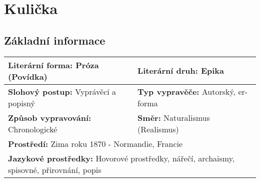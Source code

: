 \section{Kulička}
\subsection*{Základní informace}
\begin{tabularx}{\linewidth}{l|l}
    \textbf{Literární forma:} Próza (Povídka)    & \textbf{Literární druh:} Epika                                         \\
    \hline
    \textbf{Slohový postup:} Vyprávěcí a popisný & \textbf{Typ vypravěče:} Autorský, er-forma                             \\
    \hline
    \textbf{Způsob vypravování:} Chronologické   & \textbf{Směr:} Naturalismus (Realismus)                                \\
    \hline
    \multicolumn{2}{l}{\textbf{Prostředí:} Zima roku 1870 - Normandie, Francie}                                           \\
    \hline
    \multicolumn{2}{l}{\textbf{Jazykové prostředky:} Hovorové prostředky, nářečí, archaismy, spisovné, přirovnání, popis} \\
\end{tabularx}
